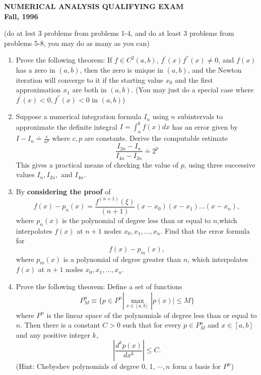 \documentclass{article}
\begin{document}
 
\begin{large}
 
\begin{center}
    \begin{Large}
        {\bf NUMERICAL ANALYSIS QUALIFYING EXAM \\
            Fall, 1996}\\
    \end{Large}
\end{center}
 
\vspace{.1in}
 
 
(do at lest 3 problems from problems 1-4, and do at least
3 problems from problems 5-8, you may do as many as you can)  \\


 \begin{enumerate}

\item Prove the following theorem:  If $f \in C^2(a,b) $,  
$f^{'}(x) f^{''}(x) \neq 0$, and $f(x)$ has a zero  in $(a,b)$,
then the zero is unique in $(a,b)$, and the Newton iteration 
will converge to
it if the starting value $x_0$ and the first approximation $x_1$
are both in $(a,b)$.  
(You may just do a special  case where $f^{'}(x) < 0,  f^{''}(x) < 0$
in $(a,b)$)


\item Suppose a numerical integration formula $I_n$ using $n$ 
subintervals to approximate the definite integral 
$I = \int_a^b f(x) dx$  has an error given by 
$I-I_n \doteq \frac{c}{n^p} $ where $c, p$ are  constants.
Derive the computable estimate
\[   \frac{I_{2n} - I_n}{I_{4n} - I_{2n}} \doteq  2^p  \]
This gives a practical means of checking the value of $p$,
using three successive values $I_n, I_{2n}, $ and $I_{4n}$.

\item  By {\bf considering the proof}  of 
\[  f(x) - p_n(x) = \frac{f^{(n+1)}(\xi)}{(n+1)\!} (x-x_0)(x-x_1) \ldots
 (x-x_n) ,     \]
where $p_n(x)$ is the polynomial of degree less than or
equal to $n$,which interpolates $f(x)$ at $n+1$ nodes
$x_0, x_1, \ldots, x_n$.
Find that the error formula for
\[ f(x) - p_m(x) , \]
where $p_m(x)$ is a polynomial of degree greater than $n$,
which interpolates $f(x)$ at $n+1$ nodes
$x_0, x_1, \ldots, x_n$.
\item 

Prove the following theorem:
Define a  set of functions 
$$P_M^n  \equiv \{p \in P^n | \max_{x \in [a,b]} |p(x)| \leq M \}
$$ where $P^n$ is the linear space of the polynomials of degree less than or 
equal to $n$.
Then there is a constant $C > 0$ such that for every $p \in P_M^n$
and $x \in [a, b]$ and any positive integer $k$,
$$ |\frac{d^k p(x)}{dx^k}| \leq C. $$
(Hint: Chebyshev polynomials of degree 0, 1, $\cdots, n$ form
a basis for $P^n$)



\end{enumerate}
\end{large}
\end{document}
